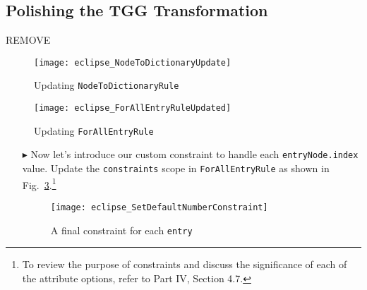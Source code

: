 \newpage
\hypertarget{m2ttex}{}
\subsection{Polishing the TGG Transformation}
\texHeader

{\huge REMOVE}

\vspace{0.5cm}

\begin{figure}[htp]
\begin{center}
  \texttt{[image: eclipse\_NodeToDictionaryUpdate]}
  \caption[labelInTOC]{Updating \texttt{NodeToDictionaryRule}}
  \label{eclipse:NodeToDictionaryRuleUpdated}
\end{center}
\end{figure}

\begin{figure}[htp]
\begin{center}
  \texttt{[image: eclipse\_ForAllEntryRuleUpdated]}
  \caption[labelInTOC]{Updating \texttt{ForAllEntryRule}}
  \label{eclipse:ForAllEntryRuleUpdated}
\end{center}
\end{figure} 

\begin{itemize}

\item[$\blacktriangleright$] Now let's introduce our custom constraint to handle each \texttt{entryNode.index}
value. Update the \texttt{constraints} scope in \texttt{ForAllEntryRule} as shown in Fig.~\ref{eclipse:newEntryConstraint}.\footnote{ To review the purpose of
constraints and discuss the significance of each of the attribute options, refer to Part IV, Section 4.7.}

\vspace{0.5cm}

\begin{figure}[htbp]
\begin{center}
  \texttt{[image: eclipse\_SetDefaultNumberConstraint]}
  \caption{A final constraint for each \texttt{entry}}
  \label{eclipse:newEntryConstraint}
\end{center}
\end{figure}

\end{itemize}
